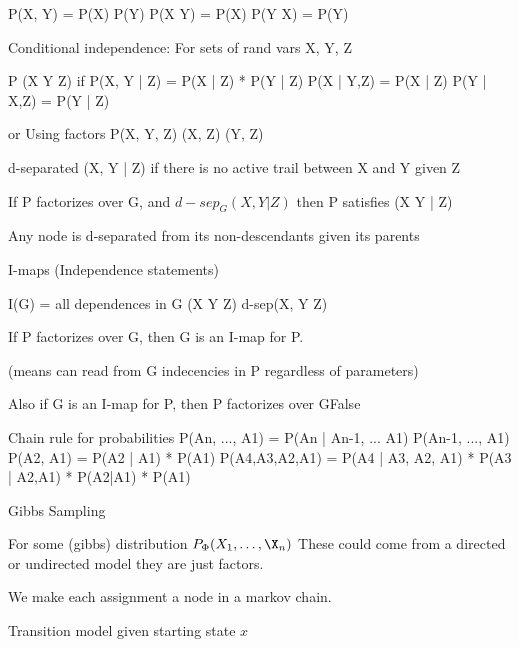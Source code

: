 \documentclass[10pt,twocolumn,letterpaper]{article}
\begin{document}
 P(X, Y) = P(X) P(Y)
 P(X \given Y) = P(X) 
 P(Y \given X) = P(Y) 


 Conditional independence:
 For sets of rand vars X, Y, Z

 P \models (X \perp Y \given Z) if 
 P(X, Y | Z) = P(X | Z) * P(Y | Z)
 P(X | Y,Z) = P(X | Z)
 P(Y | X,Z) = P(Y | Z)

 or Using factors
 P(X, Y, Z) \prop {}(X, Z) (Y, Z)


 d-separated (X, Y | Z) if there is no active trail between X and Y given Z


 If P factorizes over G, and $d-sep_G(X, Y | Z)$ then 
 P satisfies (X \perp Y | Z) 


 Any node is d-separated from its non-descendants given its parents


 I-maps (Independence statements)

 I(G) = all dependences in G (X \perp Y \given Z) \where d-sep(X, Y \given Z)


 If P factorizes over G, then G is an I-map for P. 

(means can read from G indecencies in P regardless of parameters)

Also if G is an I-map for P, then P factorizes over GFalse

Chain rule for probabilities 
P(An, ..., A1) = P(An | An-1, ... A1) P(An-1, ..., A1)
P(A2, A1) = P(A2 | A1) * P(A1)
P(A4,A3,A2,A1) = P(A4 | A3, A2, A1) * P(A3 | A2,A1) * P(A2|A1) * P(A1)


Gibbs Sampling


For some (gibbs) distribution $P_\Phi(X_1, \ldots, \X_n)$
These could come from a directed or undirected model
they are just factors. 

We make each assignment a node in a markov chain. 

Transition model given starting state $x$

\begin{comment}
python << endpython

# P - probability distribution 
def gibbs_sample(P):
    """
    X_list = [X1, X2, ..., Xn]
    """
    # Start with an arbitrary ordering
    X_list = P.random_state()
    for i in range(n):
        # Sample value of x_i given the values of the rest
        Xs_sans_i = X_list[:i] + X_list[i + 1:]
        x_i = P.sample(given=Xs_sans_i)
        # Set x_i and iterate for a new variable
        X_list[i] = x_i



class JointDistri(object)
    def sample(self, given):
        #The chain rule allows us to compute the numerator by simply multiplying all
        #factors together (operations are linear in the number of factors). We can
        #get the denominator by simply summing out Xi from the numerator (which is
        #linear in the number of values of Xi). Therefore it's always tractable.
        #
    sample(X_i, given=Xs_sans_i) = sample(X_i, Xs_sans_i) / P(Xs_sans_i)
endpython
\end{comment}
\end{document}
